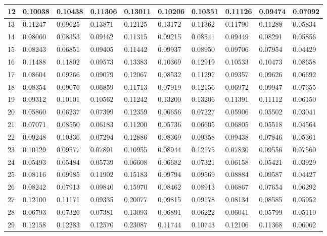 \begin{table}[H]
{\begin{tabular}{|l|l|l|l|l|l|l|l|l|l|}
        12 & 0.10038 & 0.10438 & 0.11306 & 0.13011 & 0.10206 & 0.10351 & 0.11126 & 0.09474 & 0.07092 \\ \hline
        13 & 0.11247 & 0.09625 & 0.13871 & 0.12125 & 0.13172 & 0.11362 & 0.11790 & 0.11288 & 0.05834 \\ \hline
        14 & 0.08060 & 0.08353 & 0.09162 & 0.11315 & 0.09215 & 0.08541 & 0.09449 & 0.08291 & 0.05856 \\ \hline
        15 & 0.08243 & 0.06851 & 0.09405 & 0.11442 & 0.09937 & 0.08950 & 0.09706 & 0.07954 & 0.04429 \\ \hline
        16 & 0.11488 & 0.11802 & 0.09573 & 0.13383 & 0.10369 & 0.12919 & 0.10533 & 0.10473 & 0.08658 \\ \hline
        17 & 0.08604 & 0.09266 & 0.09079 & 0.12067 & 0.08532 & 0.11297 & 0.09357 & 0.09626 & 0.06692 \\ \hline
        18 & 0.08354 & 0.09076 & 0.06859 & 0.11713 & 0.07919 & 0.12156 & 0.06972 & 0.09947 & 0.07655 \\ \hline
        19 & 0.09312 & 0.10101 & 0.10562 & 0.11242 & 0.13200 & 0.13206 & 0.11391 & 0.11112 & 0.06150 \\ \hline
        20 & 0.05860 & 0.06237 & 0.07399 & 0.12359 & 0.06656 & 0.07227 & 0.05906 & 0.05502 & 0.03041 \\ \hline
        21 & 0.07071 & 0.08550 & 0.06183 & 0.11200 & 0.05736 & 0.06605 & 0.06805 & 0.05518 & 0.04564 \\ \hline
        22 & 0.09248 & 0.10336 & 0.07294 & 0.12886 & 0.08369 & 0.09358 & 0.09438 & 0.07846 & 0.05361 \\ \hline
        23 & 0.10129 & 0.09577 & 0.07801 & 0.10955 & 0.08944 & 0.12175 & 0.07830 & 0.09556 & 0.07560 \\ \hline
        24 & 0.05493 & 0.05484 & 0.05739 & 0.06608 & 0.06682 & 0.07321 & 0.06158 & 0.05421 & 0.03929 \\ \hline
        25 & 0.08116 & 0.09985 & 0.11902 & 0.15183 & 0.09794 & 0.09569 & 0.08884 & 0.09587 & 0.04427 \\ \hline
        26 & 0.08242 & 0.07913 & 0.09840 & 0.15970 & 0.08462 & 0.08913 & 0.06867 & 0.07654 & 0.06292 \\ \hline
        27 & 0.12100 & 0.11171 & 0.09335 & 0.20077 & 0.09815 & 0.09178 & 0.08134 & 0.08585 & 0.05952 \\ \hline
        28 & 0.06793 & 0.07326 & 0.07381 & 0.13093 & 0.06891 & 0.06222 & 0.06041 & 0.05799 & 0.05110 \\ \hline
        29 & 0.12158 & 0.12283 & 0.12570 & 0.23087 & 0.11744 & 0.10743 & 0.12106 & 0.11368 & 0.06062 \\ \hline

\end{tabular}}
\end{table}
